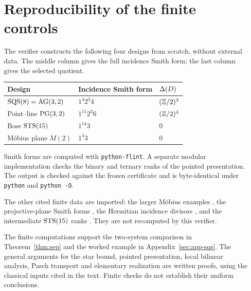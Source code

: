 \section{Reproducibility of the finite controls}\label{sec:app-repro}

The verifier  constructs the following four designs
from scratch, without external data. The middle column gives the full
incidence Smith form; the last column gives the selected quotient.

\begin{center}
\begin{tabular}{lll}
\toprule
Design & Incidence Smith form & $\Delta(D)$ \\
\midrule
$\mathrm{SQS}(8)=\mathrm{AG}(3,2)$ & $1^4 2^3 4$ & $(\mathbb{Z}/2)^3$ \\
Point--line $\mathrm{PG}(3,2)$ & $1^{11}2^3 6$ & $(\mathbb{Z}/2)^4$ \\
Bose $\mathrm{STS}(15)$ & $1^{14}3$ & $0$ \\
M\"obius plane $M(2)$ & $1^4 3$ & $0$ \\
\bottomrule
\end{tabular}
\end{center}

Smith forms are computed with \texttt{python-flint}. A separate modular
implementation checks the binary and ternary ranks of the pointed
presentation. The output is checked against the frozen certificate
 and is byte-identical under
\texttt{python} and \texttt{python -O}.

The other cited finite data are imported: the larger M\"obius examples
\cite{Ringe2008}, the projective-plane Smith forms \cite{ChandlerSinXiang},
the Hermitian incidence divisors \cite{Hiss}, and the intermediate
$\mathrm{STS}(15)$ ranks \cite{TonchevWeishaar,ShiXuKrotov}. They are not recomputed
by this verifier.

The finite computations support the two-system comparison in
Theorem~\ref{thm:sep} and the worked example in Appendix~\ref{sec:app-sqs}.
The general arguments for the star bound, pointed presentation, local
bilinear analysis, Pasch transport and elementary realization are written
proofs, using the classical inputs cited in the text. Finite checks do not
establish their uniform conclusions.
